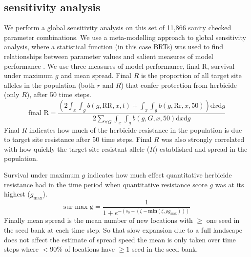 \documentclass[12pt,a4paper]{article}
\begin{document}
\subsection*{sensitivity analysis}
We perform a global sensitivity analysis on this set of 11,866 sanity checked parameter combinations. We use a meta-modelling approach to global sensitivity analysis, where a statistical function (in this case BRTs) was used to find relationships between parameter values and salient measures of model performance \citep{Cout2014}. We use three measures of model performance, final R, survival under maximum $g$ and mean spread. Final $R$ is the proportion of all target site alleles in the population (both $r$ and $R$) that confer protection from herbicide (only $R$), after 50 time steps. 
\begin{equation}\label{eq:fin_R}
	\text{final R} = \frac{\left(2\int_x\int_g b(g, \text{RR}, x, t) + \int_x\int_g b(g, \text{Rr}, x, 50) \right)\text{d}x\text{d}g}{2\sum_{\forall G} \int_x\int_g b(g, G, x, 50)\text{d}x\text{d}g}
\end{equation}
Final $R$ indicates how much of the herbicide resistance in the population is due to target site resistance after 50 time steps. Final $R$ was also strongly correlated with how quickly the target site resistant allele ($R$) established and spread in the population.        

Survival under maximum $g$ indicates how much effect quantitative herbicide resistance had in the time period when quantitative resistance score $g$ was at its highest ($g_\text{max}$).
\begin{equation}\label{eq:sur_max_g}
	\text{sur max g} = \frac{1}{1 + e^{-(s_0 - (\xi - \textbf{min}(\xi, \rho g_\text{max})))}}
\end{equation}       
Finally mean spread is the mean number of new locations with $\geq$ one seed in the seed bank at each time step. So that slow expansion due to a full landscape does not affect the estimate of spread speed the mean is only taken over time steps where $<$90\% of locations have $\geq 1$ seed in the seed bank.
\end{document}
